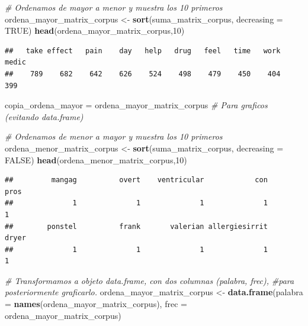 \documentclass[spanish,]{article}
\newenvironment{Shaded}{\begin{snugshade}}{\end{snugshade}}
\newcommand{\KeywordTok}[1]{\textcolor[rgb]{0.13,0.29,0.53}{\textbf{#1}}}
\newcommand{\DataTypeTok}[1]{\textcolor[rgb]{0.13,0.29,0.53}{#1}}
\newcommand{\DecValTok}[1]{\textcolor[rgb]{0.00,0.00,0.81}{#1}}
\newcommand{\StringTok}[1]{\textcolor[rgb]{0.31,0.60,0.02}{#1}}
\newcommand{\CommentTok}[1]{\textcolor[rgb]{0.56,0.35,0.01}{\textit{#1}}}
\newcommand{\OtherTok}[1]{\textcolor[rgb]{0.56,0.35,0.01}{#1}}
\newcommand{\NormalTok}[1]{#1}
\begin{document}
\begin{Shaded}
\begin{Highlighting}[]
\CommentTok{# Ordenamos de mayor a menor y muestra los 10 primeros}
\NormalTok{ordena_mayor_matrix_corpus <-}\StringTok{ }\KeywordTok{sort}\NormalTok{(suma_matrix_corpus, }\DataTypeTok{decreasing =} \OtherTok{TRUE}\NormalTok{)}
\KeywordTok{head}\NormalTok{(ordena_mayor_matrix_corpus,}\DecValTok{10}\NormalTok{)}
\end{Highlighting}
\end{Shaded}

\begin{verbatim}
##   take effect   pain    day   help   drug   feel   time   work  medic 
##    789    682    642    626    524    498    479    450    404    399
\end{verbatim}

\begin{Shaded}
\begin{Highlighting}[]
\NormalTok{copia_ordena_mayor =}\StringTok{ }\NormalTok{ordena_mayor_matrix_corpus }\CommentTok{# Para graficos (evitando data.frame)}

\CommentTok{# Ordenamos de menor a mayor y muestra los 10 primeros}
\NormalTok{ordena_menor_matrix_corpus <-}\StringTok{ }\KeywordTok{sort}\NormalTok{(suma_matrix_corpus, }\DataTypeTok{decreasing =} \OtherTok{FALSE}\NormalTok{)}
\KeywordTok{head}\NormalTok{(ordena_menor_matrix_corpus,}\DecValTok{10}\NormalTok{)}
\end{Highlighting}
\end{Shaded}

\begin{verbatim}
##         mangag          overt    ventricular            con           pros 
##              1              1              1              1              1 
##        ponstel          frank       valerian allergiesirrit          dryer 
##              1              1              1              1              1
\end{verbatim}

\begin{Shaded}
\begin{Highlighting}[]
\CommentTok{# Transformamos a objeto data.frame, con dos columnas (palabra, frec), }
\CommentTok{#para posteriormente graficarlo.}
\NormalTok{ordena_mayor_matrix_corpus <-}\StringTok{ }\KeywordTok{data.frame}\NormalTok{(}\DataTypeTok{palabra =} \KeywordTok{names}\NormalTok{(ordena_mayor_matrix_corpus), }
                                         \DataTypeTok{frec =}\NormalTok{ ordena_mayor_matrix_corpus)}
\end{Highlighting}
\end{Shaded}
\end{document}

